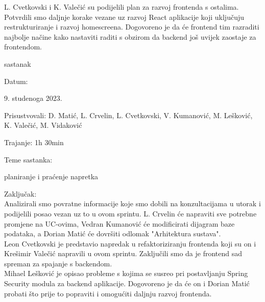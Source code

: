 \begin{packed_enum}
\begin{packed_item}
                L. Cvetkovski i K. Valečić su podijelili plan za razvoj frontenda s ostalima. Potvrdili smo daljnje korake
                vezane uz razvoj React aplikacije koji uključuju restrukturiranje i razvoj homescreena. Dogovoreno je da će frontend tim
                razraditi najbolje načine kako nastaviti raditi s obzirom da backend još uvijek zaostaje za frontendom.
               
			\end{packed_item}

			\item  sastanak
			\item[] \begin{packed_item}
				\item Datum: \date[{9. studenoga 2023.}
				\item Prisustvovali: D. Matić, L. Crvelin, L. Cvetkovski, V. Kumanović, M. Lešković, K. Valečić, M. Vidaković
				\item Trajanje: 1h 30min
				\item Teme sastanka: 
				\begin{packed_item}
					\item  planiranje i praćenje napretka
				\end{packed_item}
                \item Zaključak: \\
				Analizirali smo povratne informacije koje smo dobili na konzultacijama u utorak i podijelili posao vezan uz to 
				u ovom sprintu. L. Crvelin će napraviti sve potrebne promjene na UC-ovima,  Vedran Kumanović će modificirati dijagram 
				baze podataka, a Dorian Matić će dovršiti odlomak "Arhitektura sustava". \\
 
				Leon Cvetkovski je predstavio napredak u refaktoriziranju frontenda koji su on i Krešimir Valečić napravili u ovom sprintu.
				Zaključili smo da je frontend sad spreman za spajanje s backendom. \\
				 
				Mihael Lešković je opisao probleme s kojima se susreo pri postavljanju Spring Security modula za backend aplikacije. 
				Dogovoreno je da će on i Dorian Matić probati što prije to popraviti i omogućiti daljnju razvoj frontenda.
               
			\end{packed_item}


\end{packed_enum}
